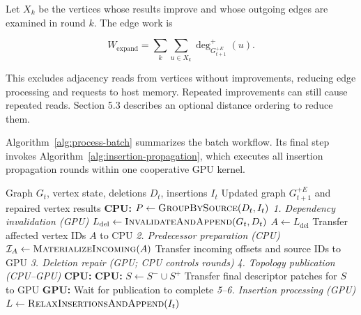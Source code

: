Let $X_k$ be the vertices whose results improve and whose outgoing edges are examined in round $k$. The edge work is

\begin{equation}
W_{\mathrm{expand}}=
\sum_k\sum_{u\in X_k}\deg^+_{G_{t+1}^{+E}}(u).
\tag{5.3}
\end{equation}

This excludes adjacency reads from vertices without improvements, reducing edge processing and requests to host memory. Repeated improvements can still cause repeated reads. Section 5.3 describes an optional distance ordering to reduce them.


Algorithm~\ref{alg:process-batch} summarizes the batch workflow. Its final step invokes Algorithm~\ref{alg:insertion-propagation}, which executes all insertion propagation rounds within one cooperative GPU kernel.

\begin{algorithm}[t]
\caption{CPU--GPU cooperative batch processing.}
\label{alg:process-batch}
\small
\begin{algorithmic}[1]
\Require Graph $G_t$, vertex state, deletions $D_t$, insertions $I_t$
\Ensure Updated graph $G_{t+1}^{+E}$ and repaired vertex results
\State \textbf{CPU:} $P \gets \Call{GroupBySource}{D_t,I_t}$
\Statex \textit{1. Dependency invalidation (GPU)}
\State $L_{\mathrm{del}} \gets \Call{InvalidateAndAppend}{G_t,D_t}$
\State $A \gets L_{\mathrm{del}}$ 
\State {}
\State Transfer affected vertex IDs $A$ to CPU
\Statex \textit{2. Predecessor preparation (CPU)}
\State {}
\State $\mathcal{I}_A \gets \Call{MaterializeIncoming}{A}$
\State Transfer incoming offsets and source IDs to GPU
\Statex \textit{3. Deletion repair (GPU; CPU controls rounds)}
\State {}
\Statex \textit{4. Topology publication (CPU--GPU)}
\State \textbf{CPU:} 
\State \textbf{CPU:} $S \gets S^- \cup S^+$ 
\State Transfer final descriptor patches for $S$ to GPU
\State \textbf{GPU:} 
\State Wait for publication to complete
\Statex \textit{5--6. Insertion processing (GPU)}
\State $L \gets \Call{RelaxInsertionsAndAppend}{I_t}$
\State {}
\end{algorithmic}
\end{algorithm}

